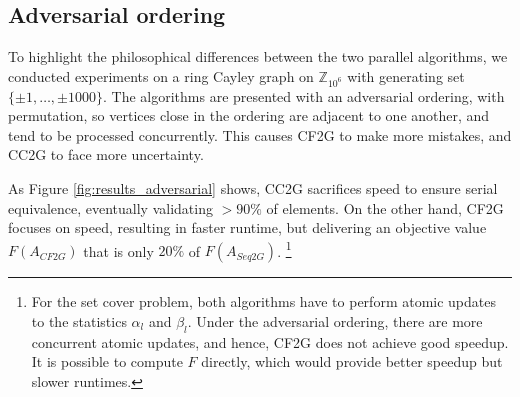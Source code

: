 \documentclass{article} %
\begin{document}
\subsection{Adversarial ordering}

To highlight the philosophical differences between the two parallel algorithms, we conducted experiments on a ring Cayley graph on $\mathbb{Z}_{10^6}$ with generating set $\{\pm 1,\dots, \pm 1000\}$.
The algorithms are presented with an adversarial ordering, with permutation, so vertices close in the ordering are adjacent to one another, and tend to be processed concurrently.
This causes CF2G to make more mistakes, and CC2G to face more uncertainty.

As Figure \ref{fig:results_adversarial} shows, CC2G sacrifices speed to ensure serial equivalence, eventually validating $>90\%$ of elements.
On the other hand, CF2G focuses on speed, resulting in faster runtime, but delivering an objective value $F(A_{CF2G})$ that is only $20\%$ of $F(A_{Seq2G})$.
\footnote{For the set cover problem, both algorithms have to perform atomic updates to the statistics $\alpha_l$ and $\beta_l$.
Under the adversarial ordering, there are more concurrent atomic updates, and hence, CF2G does not achieve good speedup.
It is possible to compute $F$ directly, which would provide better speedup but slower runtimes.}
\end{document}
